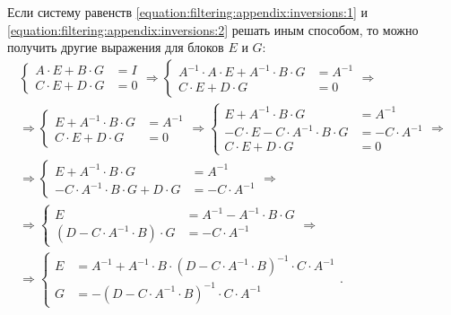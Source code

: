 Если систему равенств \eqref{equation:filtering:appendix:inversions:1} и \eqref{equation:filtering:appendix:inversions:2} решать иным способом, то можно
получить другие выражения для блоков $E$ и $G$:
\begin{gather*}
	\left \{
	\begin{array}{cl}
		A \cdot E + B \cdot G & = I \\
		C \cdot E + D \cdot G & = 0
	\end{array}
	\right .
	\Rightarrow
	\left \{
	\begin{array}{cl}
		A^{-1} \cdot A \cdot E + A^{-1} \cdot B \cdot G & = A^{-1} \\
		C \cdot E + D \cdot G & = 0
	\end{array}
	\right .
	\Rightarrow \\
	\Rightarrow
	\left \{
	\begin{array}{cl}
		E + A^{-1} \cdot B \cdot G & = A^{-1} \\
		C \cdot E + D \cdot G & = 0
	\end{array}
	\right .
	\Rightarrow
	\left \{
	\begin{array}{cl}
		E + A^{-1} \cdot B \cdot G & = A^{-1} \\
		-C \cdot E - C \cdot A^{-1} \cdot B \cdot G & = -C \cdot A^{-1} \\
		C \cdot E + D \cdot G & = 0
	\end{array}
	\right .
	\Rightarrow \\
	\Rightarrow
	\left \{
	\begin{array}{cl}
		E + A^{-1} \cdot B \cdot G & = A^{-1} \\
		- C \cdot A^{-1} \cdot B \cdot G + D \cdot G & = -C \cdot A^{-1}
	\end{array}
	\right .
	\Rightarrow \\
	\Rightarrow
	\left \{
	\begin{array}{cl}
		E & =  A^{-1} - A^{-1} \cdot B \cdot G \\
		\left ( D - C \cdot A^{-1} \cdot B \right ) \cdot G & = -C \cdot A^{-1}
	\end{array}
	\right .
	\Rightarrow \\
	\Rightarrow
	\left \{
	\begin{array}{cl}
		E & =  A^{-1} + A^{-1} \cdot B \cdot \left ( D - C \cdot A^{-1} \cdot B \right )^{-1} \cdot C \cdot A^{-1} \\
		G & = - \left ( D - C \cdot A^{-1} \cdot B \right )^{-1} \cdot C \cdot A^{-1}
	\end{array}
	\right .
	.
\end{gather*}

